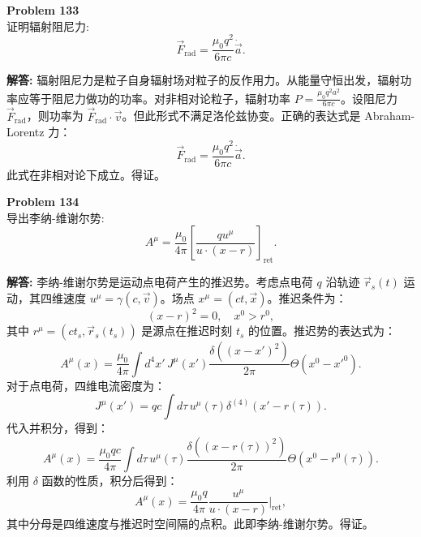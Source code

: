 \documentclass[12pt, a4paper, oneside]{ctexart}
\newenvironment{solution}{\par\noindent\textbf{解答:}\quad}{\par}
\begin{document}
\begin{mdframed}[backgroundcolor=gray!10, linewidth=0pt]
    \textbf{Problem 133} \\
    证明辐射阻尼力:
    \[
    \vec{F}_{\text{rad}} = \frac{\mu_0 q^2}{6\pi c} \dot{\vec{a}}.
    \]
\end{mdframed}
\begin{solution}
    辐射阻尼力是粒子自身辐射场对粒子的反作用力。从能量守恒出发，辐射功率应等于阻尼力做功的功率。对非相对论粒子，辐射功率 $P = \frac{\mu_0 q^2 a^2}{6\pi c}$。设阻尼力 $\vec{F}_{\text{rad}}$，则功率为 $\vec{F}_{\text{rad}} \cdot \vec{v}$。但此形式不满足洛伦兹协变。正确的表达式是 Abraham-Lorentz 力：
    \[
    \vec{F}_{\text{rad}} = \frac{\mu_0 q^2}{6\pi c} \dot{\vec{a}}.
    \]
    此式在非相对论下成立。得证。
\end{solution}

\begin{mdframed}[backgroundcolor=gray!10, linewidth=0pt]
    \textbf{Problem 134} \\
    导出李纳-维谢尔势:
    \[
    A^{\mu} = \frac{\mu_0}{4\pi} \left[ \frac{qu^{\mu}}{u \cdot (x - r)} \right]_{\text{ret}}.
    \]
\end{mdframed}
\begin{solution}
    李纳-维谢尔势是运动点电荷产生的推迟势。考虑点电荷 $q$ 沿轨迹 $\vec{r}_s(t)$ 运动，其四维速度 $u^\mu = \gamma(c, \vec{v})$。场点 $x^\mu = (ct, \vec{x})$。推迟条件为：
    \[
    (x - r)^2 = 0, \quad x^0 > r^0,
    \]
    其中 $r^\mu = (c t_s, \vec{r}_s(t_s))$ 是源点在推迟时刻 $t_s$ 的位置。推迟势的表达式为：
    \[
    A^\mu(x) = \frac{\mu_0}{4\pi} \int d^4 x' \, J^\mu(x') \frac{\delta((x-x')^2)}{2\pi} \Theta(x^0 - x'^0).
    \]
    对于点电荷，四维电流密度为：
    \[
    J^\mu(x') = q c \int d\tau \, u^\mu(\tau) \delta^{(4)}(x' - r(\tau)).
    \]
    代入并积分，得到：
    \[
    A^\mu(x) = \frac{\mu_0 q c}{4\pi} \int d\tau \, u^\mu(\tau) \frac{\delta((x - r(\tau))^2)}{2\pi} \Theta(x^0 - r^0(\tau)).
    \]
    利用 $\delta$ 函数的性质，积分后得到：
    \[
    A^\mu(x) = \frac{\mu_0 q}{4\pi} \frac{u^\mu}{u \cdot (x - r)} \bigg|_{\text{ret}},
    \]
    其中分母是四维速度与推迟时空间隔的点积。此即李纳-维谢尔势。得证。
\end{solution}
\end{document}
